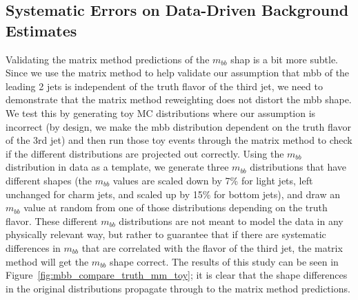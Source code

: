 \subsection{Systematic Errors on Data-Driven Background Estimates}
Validating the matrix method predictions of the $m_{bb}$ shap is a bit more subtle. 
Since we use the matrix method to help validate our assumption that mbb of the leading 2 jets is independent of the truth
 flavor of the third jet, we need to demonstrate that the matrix method reweighting does not distort the
 mbb shape. We test this by generating toy MC distributions where our assumption is incorrect (by design,
 we make the mbb distribution dependent on the truth flavor of the 3rd jet) and then run those toy events
 through the matrix method to check if the different distributions are projected out correctly.
 Using the $m_{bb}$ distribution in data as a template, we generate three $m_{bb}$ distributions that have different
 shapes (the $m_{bb}$ values are scaled down by 7\% for light jets, left unchanged for charm jets, and scaled
 up by 15\% for bottom jets), and draw an $m_{bb}$ value at random from one of those distributions depending
 on the truth flavor. These different $m_{bb}$ distributions are not meant to model the data in any physically
 relevant way, but rather to guarantee that if there are systematic differences in $m_{bb}$ that are correlated
 with the flavor of the third jet, the matrix method will get the $m_{bb}$ shape correct.
 The results of this study can be seen in Figure~\ref{fig:mbb_compare_truth_mm_toy}; it is clear that the 
shape differences in the original distributions propagate through to the matrix method predictions.



